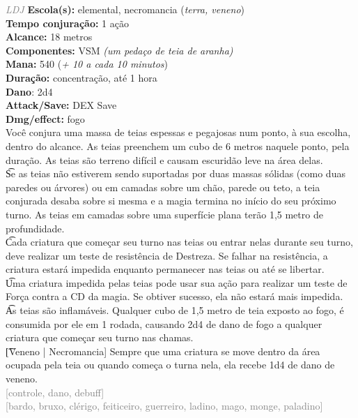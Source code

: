 \documentclass{RPG_Adventure}[2021/10/20]
\begin{document}
{\tiny \textcolor{gray}{\textit{LDJ}}}
{\small \t \textbf{Escola(s):} elemental, necromancia (\textit{terra, veneno})\\\t \textbf{Tempo conjuração:} 1 ação\\\t \textbf{Alcance:} 18 metros\\\t \textbf{Componentes:} VSM \textit{(um pedaço de teia de aranha)}\\\t \textbf{Mana:} 540 (\textit{+ 10 a cada 10 minutos})\\\t \textbf{Duração:} concentração, até 1 hora\\\t \textbf{Dano}: 2d4\\\t \textbf{Attack/Save:} DEX Save\\\t \textbf{Dmg/effect:} fogo\\}
{\normalsize Você conjura uma massa de teias espessas e pegajosas num ponto, à sua escolha, dentro do alcance. As teias preenchem um cubo de 6 metros naquele ponto, pela duração. As teias são terreno difícil e causam escuridão leve na área delas.\\\t Se as teias não estiverem sendo suportadas por duas massas sólidas (como duas paredes ou árvores) ou em camadas sobre um chão, parede ou teto, a teia conjurada desaba sobre si mesma e a magia termina no início do seu próximo turno. As teias em camadas sobre uma superfície plana terão 1,5 metro de profundidade.\\\t Cada criatura que começar seu turno nas teias ou entrar nelas durante seu turno, deve realizar um teste de resistência de Destreza. Se falhar na resistência, a criatura estará impedida enquanto permanecer nas teias ou até se libertar.\\\t Uma criatura impedida pelas teias pode usar sua ação para realizar um teste de Força contra a CD da magia. Se obtiver sucesso, ela não estará mais impedida.\\\t As teias são inflamáveis. Qualquer cubo de 1,5 metro de teia exposto ao fogo, é consumida por ele em 1 rodada, causando 2d4 de dano de fogo a qualquer criatura que começar seu turno nas chamas.\\\t [Veneno | Necromancia] Sempre que uma criatura se move dentro da área ocupada pela teia ou quando começa o turna nela, ela recebe 1d4 de dano de veneno.\\}
{\scriptsize \textcolor{gray}{[controle, dano, debuff]\\}}
{\scriptsize \textcolor{gray}{[bardo, bruxo, clérigo, feiticeiro, guerreiro, ladino, mago, monge, paladino]\\}}
\end{document}
